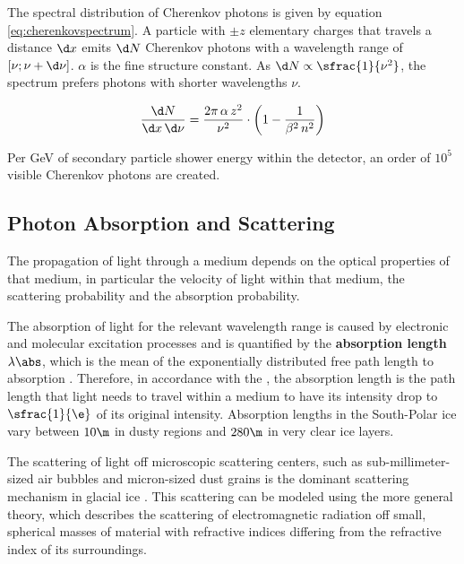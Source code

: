 The spectral distribution of Cherenkov photons is given by equation \ref{eq:cherenkovspectrum}. A particle with $\pm z$ elementary charges that travels a distance $\d x$ emits $\d N$ Cherenkov photons with a wavelength range of $[\nu; \nu + \d\nu]$. $\alpha$ is the fine structure constant. \cite{katz2012}
As $\d N \propto \sfrac{1}{\nu^2}$, the spectrum prefers photons with shorter wavelengths $\nu$.

\begin{equation}
  \frac{\d N}{\d x\,\d\nu} = \frac{2\pi\,\alpha\,z^2}{\nu^2}\cdot
  \left( 1 - \frac{1}{\beta^2\,n^2} \right)
  \label{eq:cherenkovspectrum}
\end{equation}

Per GeV of secondary particle shower energy within the detector, an order of $10^5$\nbsp visible Cherenkov photons are created. \cite{instrumentation}




\subsection{Photon Absorption and Scattering}
\label{sec:scattering}

The propagation of light through a medium depends on the optical properties of that medium, in particular the velocity of light within that medium, the scattering probability and the absorption probability. \cite{lundberg}

The absorption of light for the relevant wavelength range is caused by electronic and molecular excitation processes \cite{lundberg}
and is quantified by the \textbf{absorption length} $\lambda\abs$, which is the mean of the exponentially distributed free path length to absorption \cite{lundberg}.
Therefore, in accordance with the , the absorption length is the path length that light needs to travel within a medium to have its intensity drop to $\sfrac{1}{\e}$ of its original intensity. \cite{lexikonderphysik}
Absorption lengths in the South-Polar ice vary between $10\m$ in dusty regions and $280\m$ in very clear ice layers. \cite{ackermann, ppcpaper, icepaper}

The scattering of light off microscopic scattering centers, such as sub-millimeter-sized air bubbles and micron-sized dust grains \cite{Price1997, ackermann} is the dominant scattering mechanism in glacial ice \cite{Askebjer1997, lundberg}. This scattering can be modeled using the more general  theory, which describes the scattering of electromagnetic radiation off small, spherical masses of material with refractive indices differing from the refractive index of its surroundings. \cite{Mie1908, ackermann, lundberg}

